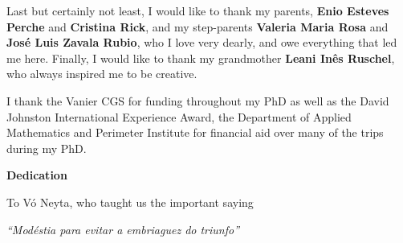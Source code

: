 Last but certainly not least, I would like to thank my parents, \textbf{Enio Esteves Perche} and \textbf{Cristina Rick}, and my step-parents \textbf{Valeria Maria Rosa} and \textbf{José Luis Zavala Rubio}, who I love very dearly, and owe everything that led me here. Finally, I would like to thank my grandmother \textbf{Leani Inês Ruschel}, who always inspired me to be creative.

I thank the Vanier CGS for funding throughout my PhD as well as the David Johnston International Experience Award, the Department of Applied Mathematics and Perimeter Institute for financial aid over many of the trips during my PhD.




\cleardoublepage
{}    %

\begin{center}\textbf{Dedication}\end{center}

To Vó Neyta, who taught us the important saying\\

\begin{center} \textit{``Modéstia para evitar a embriaguez do triunfo''}\end{center}


\cleardoublepage
{}    %

\renewcommand\contentsname{Table of Contents}
\tableofcontents
\cleardoublepage
{}    %

\cleardoublepage
{}    %


\listoffigures
\cleardoublepage
{}		%


\listoftables
\cleardoublepage
{}		%


